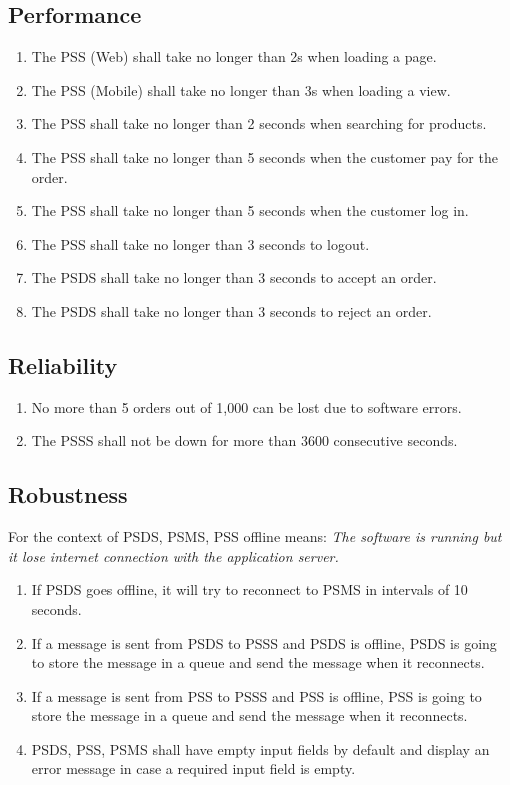 \subsection{Performance}
\begin{enumerate}[label=PER-\arabic*]
    \item The PSS (Web) shall take no longer than 2s when loading a page.
    \item The PSS (Mobile) shall take no longer than 3s when loading a view. 
    \item The PSS shall take no longer than 2 seconds when searching for 
    products.
    \item The PSS shall take no longer than 5 seconds when the customer 
    pay for the order.
    \item The PSS shall take no longer than 5 seconds when the customer 
    log in.
    \item The PSS shall take no longer than 3 seconds to logout.
    \item The PSDS shall take no longer than 3 seconds to accept an order.
    \item The PSDS shall take no longer than 3 seconds to reject an order.
\end{enumerate}

\subsection{Reliability}
\begin{enumerate}[label=REL-\arabic*]
    \item No more than 5 orders out of 1,000 can be lost due to software errors.
    \item The PSSS shall not be down for more than 3600 consecutive seconds.
\end{enumerate}

\subsection{Robustness}
For the context of PSDS, PSMS, PSS offline means: \textit{The software is 
running but it lose internet connection with the application server.}

\begin{enumerate}[label=ROB-\arabic*]
    \item If PSDS goes offline, it will try to reconnect to PSMS in 
    intervals of 10 seconds.
    \item If a message is sent from PSDS to PSSS and PSDS is offline, PSDS is 
    going to store the message in a queue and send the message 
    when it reconnects.
    \item If a message is sent from PSS to PSSS and PSS is offline, PSS is 
    going to store the message in a queue and send the message 
    when it reconnects.
    \item PSDS, PSS, PSMS shall have empty input fields by default and display 
    an error message in case a required input field is empty.
\end{enumerate}

